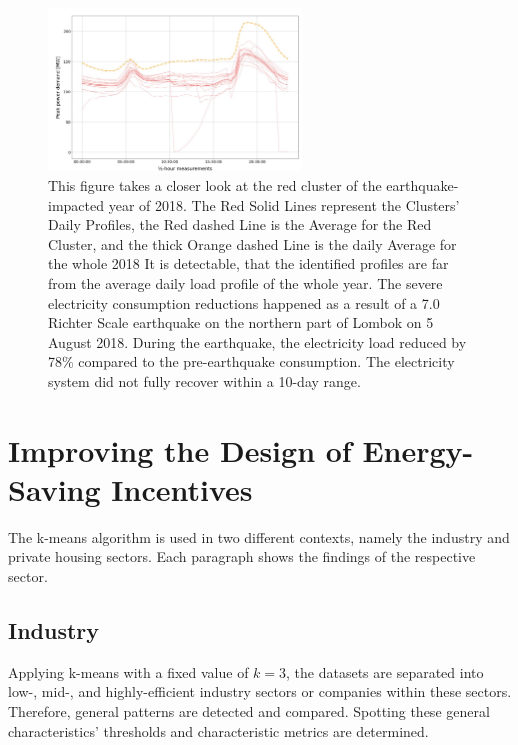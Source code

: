 \begin{figure}[H]
    \centering
    \includegraphics[width=0.6\textwidth]{figures/jessen_ndImpactedClusters/jessen_ClusterTwo2018.png}
    \caption{This figure takes a closer look at the red cluster of the earthquake-impacted year of 2018.
    The Red Solid Lines represent the Clusters' Daily Profiles, the Red dashed Line is the Average for the Red Cluster, and the thick Orange dashed Line is the daily Average for the whole 2018
    It is detectable, that the identified profiles are far from the average daily load profile of the whole year.
    The severe electricity consumption reductions happened as a result of a 7.0 Richter Scale earthquake on the northern part of Lombok on 5 August 2018.
    During the earthquake, the electricity load reduced by 78\% compared to the pre-earthquake consumption.
    The electricity system did not fully recover within a 10-day range.
    }
    \label{fig:clustering_results_2018_cluster_two}
\end{figure}

\section{Improving the Design of Energy-Saving Incentives}
\label{sec:improving_the_design_of_energy_saving_incentives}
The k-means algorithm is used in two different contexts, namely the industry and private housing sectors.
Each paragraph shows the findings of the respective sector.
\subsection{Industry}
Applying k-means with a fixed value of $k=3$, the datasets are separated into low-, mid-, and highly-efficient industry sectors or companies within these sectors.
Therefore, general patterns are detected and compared.
Spotting these general characteristics' thresholds and characteristic metrics are determined.

